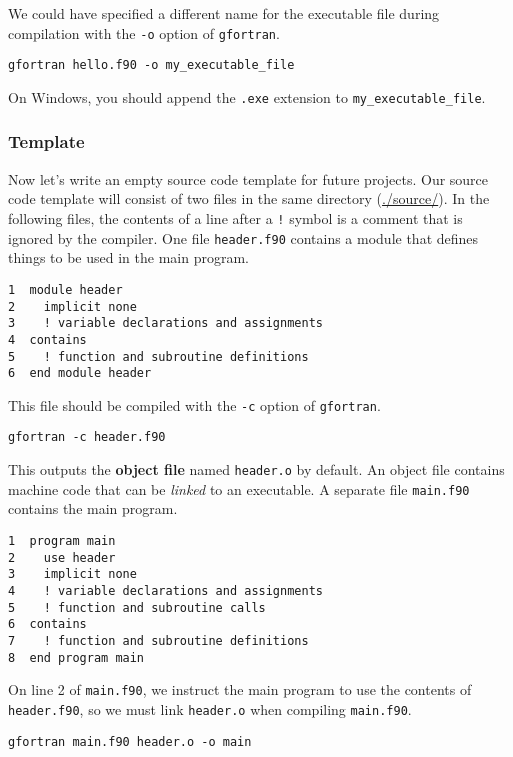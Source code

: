 \documentclass[11pt]{article}
\begin{document}
We could have specified a different name for the executable file during compilation with the \texttt{-o} option of \texttt{gfortran}.

\begin{verbatim}
gfortran hello.f90 -o my_executable_file
\end{verbatim}

On Windows, you should append the \texttt{.exe} extension to \texttt{my\_executable\_file}.

\subsubsection{Template}
\label{sec:orgheadline6}
Now let's write an empty source code template for future projects. Our source code template will consist of two files in the same directory (\url{./source/}). In the following files, the contents of a line after a \texttt{!} symbol is a comment that is ignored by the compiler. One file \texttt{header.f90} contains a module that defines things to be used in the main program.

\begin{verbatim}
1  module header
2    implicit none
3    ! variable declarations and assignments
4  contains
5    ! function and subroutine definitions
6  end module header
\end{verbatim}

This file should be compiled with the \texttt{-c} option of \texttt{gfortran}.

\begin{verbatim}
gfortran -c header.f90
\end{verbatim}

This outputs the \textbf{object file} named \texttt{header.o} by default. An object file contains machine code that can be \emph{linked} to an executable. A separate file \texttt{main.f90} contains the main program.

\begin{verbatim}
1  program main
2    use header
3    implicit none
4    ! variable declarations and assignments
5    ! function and subroutine calls
6  contains
7    ! function and subroutine definitions
8  end program main
\end{verbatim}

On line 2 of \texttt{main.f90}, we instruct the main program to use the contents of \texttt{header.f90}, so we must link \texttt{header.o} when compiling \texttt{main.f90}.

\begin{verbatim}
gfortran main.f90 header.o -o main
\end{verbatim}
\end{document}
